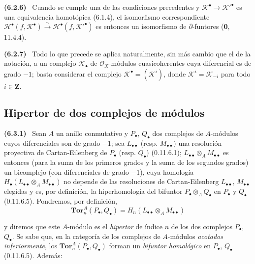 \documentclass[10pt,oneside]{book}
\newcommand{\sref}[2][]{\textup{(#2)}}
\newcommand{\oldpage}[2][]{\setcounter{footnote}{0}\marginpar{\scriptsize\textbf{#1}~|~#2}\ignorespaces}
\newenvironment{env}[1][]{\par\medskip\noindent\textbf{(#1)}\ }{\par}
\begin{document}
\begin{env}[6.2.6]
Cuando se cumple una de las condiciones precedentes y
$\mathscr K^\bullet\to\mathscr K'^\bullet$ es una equivalencia homotópica (6.1.4), el
isomorfismo correspondiente
$\mathscr H^\bullet(f,\mathscr K^\bullet)\xrightarrow{\sim}
\mathscr H^\bullet(f,\mathscr K'^\bullet)$ es entonces un isomorfismo de
$\partial$-funtores (\textbf 0, 11.4.4).
\end{env}

\begin{env}[6.2.7]
Todo lo que precede se aplica naturalmente, sin más cambio que el de la
notación, a un complejo $\mathscr K_\bullet$ de $\mathscr O_X$-módulos
cuasicoherentes cuya diferencial es de grado $-1$; basta considerar el
complejo $\mathscr K^\bullet=(\mathscr K^i)$, donde
$\mathscr K^i=\mathscr K_{-i}$ para todo $i\in\mathbf Z$.
\end{env}

\subsection{Hipertor de dos complejos de módulos}
\label{subsection:III.6.3}

\begin{env}[6.3.1]
\label{III.6.3.1}
Sean $A$ un anillo conmutativo y $P_\bullet$, $Q_\bullet$ dos complejos de
$A$-módulos cuyos diferenciales son de grado $-1$; sea
$L_{\bullet\bullet}$ (resp. $M_{\bullet\bullet}$) una resolución proyectiva
de Cartan-Eilenberg de $P_\bullet$ (resp. $Q_\bullet$)
\sref[0]{0.11.6.1};
$L_{\bullet\bullet}\otimes_A M_{\bullet\bullet}$ es entonces (para la suma
de los primeros grados y la suma de los segundos grados) un bicomplejo (con
diferenciales de grado $-1$), cuya homología
$H_\bullet(L_{\bullet\bullet}\otimes_A M_{\bullet\bullet})$ no depende de las
resoluciones de Cartan-Eilenberg $L_{\bullet\bullet}$,
$M_{\bullet\bullet}$ elegidas y es, por definición, la hiperhomología del
bifuntor $P_\bullet\otimes_A Q_\bullet$ en $P_\bullet$ y $Q_\bullet$
\sref[0]{0.11.6.5}. Pondremos, por definición,
\[
  \mathbf{Tor}_n^A(P_\bullet,Q_\bullet)
  =H_n(L_{\bullet\bullet}\otimes_A M_{\bullet\bullet})
  \tag{6.3.1.1}\label{III.6.3.1.1}
\]

\oldpage[III]{142}

y diremos que este $A$-módulo es el \emph{hipertor} de índice $n$ de los dos
complejos $P_\bullet$, $Q_\bullet$. Se sabe que, en la categoría de los
complejos de $A$-módulos \emph{acotados inferiormente}, los
$\mathbf{Tor}_n^A(P_\bullet,Q_\bullet)$ forman un \emph{bifuntor homológico} en
$P_\bullet$, $Q_\bullet$ \sref[0]{0.11.6.5}. Además:
\end{env}
\end{document}
